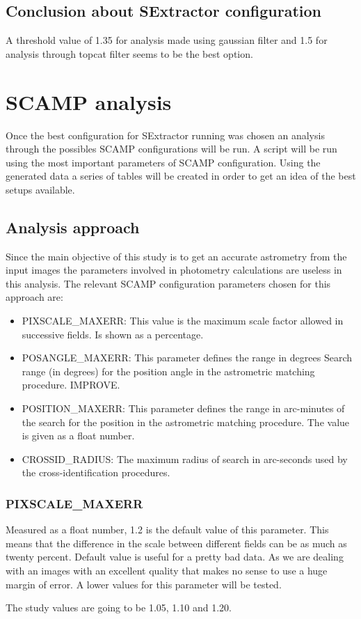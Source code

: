 \documentclass{article}
\begin{document}
\subsection{Conclusion about SExtractor configuration}
A threshold value of 1.35 for analysis made using gaussian filter and 1.5 for analysis through topcat filter seems to be the best option.

\section{SCAMP analysis}
Once the best configuration for SExtractor running was chosen an analysis through the possibles SCAMP configurations will be run. A script will be run using the most important parameters of SCAMP configuration. Using the generated data a series of tables will be created in order to get an idea of the best setups available.

\subsection{Analysis approach}
Since the main objective of this study is to get an accurate astrometry from the input images the parameters involved in photometry calculations are useless in this analysis.
The relevant SCAMP configuration parameters chosen for this approach are:

\begin{itemize}
\item PIXSCALE\_MAXERR: This value is the maximum scale factor allowed in successive fields. Is shown as a percentage.
\item POSANGLE\_MAXERR: This parameter defines the range in degrees Search range (in degrees) for the position angle in the astrometric matching procedure. IMPROVE.
\item POSITION\_MAXERR: This parameter defines the range in arc-minutes of the search for the position in the astrometric matching procedure. The value is given as a float number.
\item CROSSID\_RADIUS: The maximum radius of search in arc-seconds used by the cross-identification procedures.
\end{itemize}

\subsubsection{PIXSCALE\_MAXERR}
Measured as a float number, 1.2 is the default value of this parameter. This means that the difference in the scale between different fields can be as much as twenty percent. Default value is useful for a pretty bad data. As we are dealing with an images with an excellent quality that makes no sense to use a huge margin of error. A lower values for this parameter will be tested.
\par The study values are going to be 1.05, 1.10 and 1.20.
\end{document}
